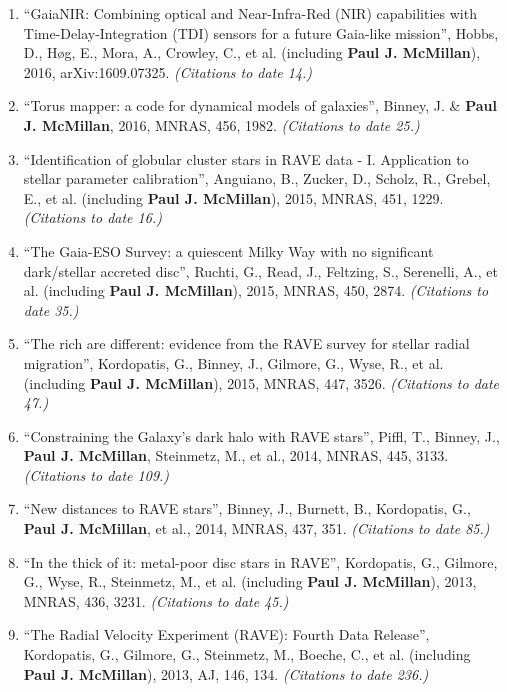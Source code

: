 \documentclass{resume}
\begin{document}
\begin{enumerate}
\item ``GaiaNIR: Combining optical and Near-Infra-Red (NIR) capabilities with Time-Delay-Integration (TDI) sensors for a future Gaia-like mission'', Hobbs, D., H{\o}g, E., Mora, A., Crowley, C., et al. (including \textbf{Paul J. McMillan}), 2016, arXiv:1609.07325. \textit{(Citations to date 14.)}

\item ``Torus mapper: a code for dynamical models of galaxies'', Binney, J. \& \textbf{Paul J. McMillan}, 2016, MNRAS, 456, 1982. \textit{(Citations to date 25.)}

\item ``Identification of globular cluster stars in RAVE data - I. Application to stellar parameter calibration'', Anguiano, B., Zucker, D., Scholz, R., Grebel, E., et al. (including \textbf{Paul J. McMillan}), 2015, MNRAS, 451, 1229. \textit{(Citations to date 16.)}

\item ``The Gaia-ESO Survey: a quiescent Milky Way with no significant dark/stellar accreted disc'', Ruchti, G., Read, J., Feltzing, S., Serenelli, A., et al. (including \textbf{Paul J. McMillan}), 2015, MNRAS, 450, 2874. \textit{(Citations to date 35.)}

\item ``The rich are different: evidence from the RAVE survey for stellar radial migration'', Kordopatis, G., Binney, J., Gilmore, G., Wyse, R., et al. (including \textbf{Paul J. McMillan}), 2015, MNRAS, 447, 3526. \textit{(Citations to date 47.)}

\item ``Constraining the Galaxy's dark halo with RAVE stars'', Piffl, T., Binney, J., \textbf{Paul J. McMillan}, Steinmetz, M., et al., 2014, MNRAS, 445, 3133. \textit{(Citations to date 109.)}

\item ``New distances to RAVE stars'', Binney, J., Burnett, B., Kordopatis, G., \textbf{Paul J. McMillan}, et al., 2014, MNRAS, 437, 351. \textit{(Citations to date 85.)}

\item ``In the thick of it: metal-poor disc stars in RAVE'', Kordopatis, G., Gilmore, G., Wyse, R., Steinmetz, M., et al. (including \textbf{Paul J. McMillan}), 2013, MNRAS, 436, 3231. \textit{(Citations to date 45.)}

\item ``The Radial Velocity Experiment (RAVE): Fourth Data Release'', Kordopatis, G., Gilmore, G., Steinmetz, M., Boeche, C., et al. (including \textbf{Paul J. McMillan}), 2013, AJ, 146, 134. \textit{(Citations to date 236.)}


\end{enumerate}
\end{document}
